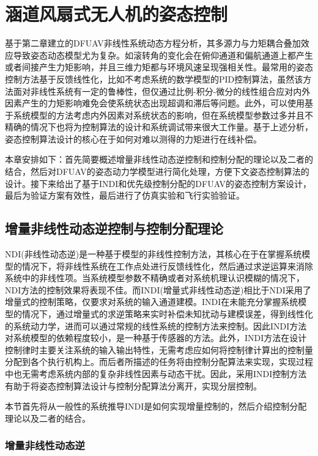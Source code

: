 \chapter{涵道风扇式无人机的姿态控制}

基于第二章建立的DFUAV非线性系统动态方程分析，其多源力与力矩耦合叠加效应导致姿态动态模型尤为复杂。如滚转角的变化会在俯仰通道和偏航通道上都产生或者间接产生力矩影响，并且三维力矩都与环境风速呈现强相关性。最常用的姿态控制方法基于反馈线性化，比如不考虑系统的数学模型的PID控制算法，虽然该方法面对非线性系统有一定的鲁棒性，但仅通过比例-积分-微分的线性组合应对内外因素产生的力矩影响难免会使系统状态出现超调和滞后等问题。此外，可以使用基于系统模型的方法考虑内外因素对系统状态的影响，但在系统模型参数过多并且不精确的情况下也将为控制算法的设计和系统调试带来很大工作量。基于上述分析，姿态控制算法设计的核心在于如何对难以测得的力矩进行在线补偿。

本章安排如下：首先简要概述增量非线性动态逆控制和控制分配的理论以及二者的结合，然后对DFUAV的姿态动力学模型进行简化处理，方便下文姿态控制算法的设计。接下来给出了基于INDI和优先级控制分配的DFUAV的姿态控制方案设计，最后为验证方案有效性，最后进行了仿真实验和飞行实验验证。

\section{增量非线性动态逆控制与控制分配理论}

NDI(非线性动态逆)是一种基于模型的非线性控制方法，其核心在于在掌握系统模型的情况下，将非线性系统在工作点处进行反馈线性化，然后通过求逆运算来消除系统中的非线性项。当系统模型参数不精确或者对系统机理认识模糊的情况下，NDI方法的控制效果将表现不佳。而INDI(增量式非线性动态逆)相比于NDI采用了增量式的控制策略，仅要求对系统的输入通道建模。INDI在未能充分掌握系统模型的情况下，通过增量式的求逆策略来实时补偿未知扰动与建模误差，得到线性化的系统动力学，进而可以通过常规的线性系统的控制方法来控制\cite{wangStabilityAnalysisIncremental2019b}。因此INDI方法对系统模型的依赖程度较小，是一种基于传感器的方法。此外，INDI方法在设计控制律时主要关注系统的输入输出特性，无需考虑应如何将控制律计算出的控制量分配到各个执行机构上。而后者所描述的任务将由控制分配算法来实现，实现过程中也无需考虑系统内部的复杂非线性因素与动态干扰。因此，采用INDI控制方法有助于将姿态控制算法设计与控制分配算法分离开，实现分层控制。

本节首先将从一般性的系统推导INDI是如何实现增量控制的，然后介绍控制分配理论以及二者的结合。

\subsection{增量非线性动态逆}

